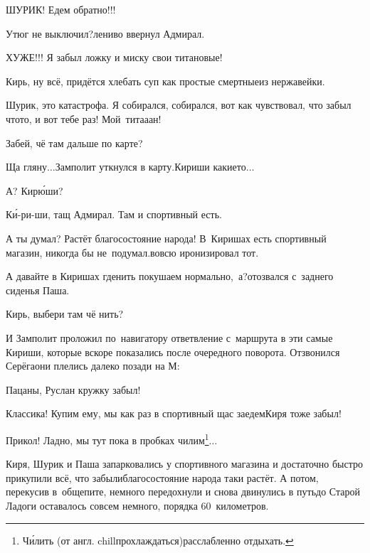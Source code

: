 \diagdash ШУРИК! Едем обратно!!!

\diagdash Утюг не выключил?\mdash лениво ввернул Адмирал.

\diagdash ХУЖЕ!!! Я забыл ложку и миску свои титановые!

\diagdash Кирь, ну всё, придётся хлебать суп как простые смертные\mdash из нержавейки.

\diagdash Шурик, это катастрофа. Я собирался, собирался, вот как чувствовал, что забыл что\sdash то, и вот тебе раз! Мой~тита\sdash а\sdash ан!

\diagdash Забей, чё там дальше по карте?

\diagdash Ща гляну$\ldots$\mdash Замполит уткнулся в карту.\mdash Кириши какие\sdash то$\ldots$

\diagdash А? Кир\'юши?

\diagdash К\'и-ри-ши, тащ Адмирал. Там и спортивный есть.

\diagdash А ты думал? Растёт благосостояние народа! В~Киришах есть спортивный магазин, никогда бы не~подумал.\mdash вовсю иронизировал тот.

\diagdash А давайте в Киришах где\sdash нить покушаем нормально,~а?\mdash отозвался с~заднего сиденья Паша.


\diagdash Кирь, выбери там чё нить?

И Замполит проложил по~навигатору ответвление с~маршрута в эти самые Кириши, которые вскоре показались после очередного поворота. Отзвонился Серёга\mdash они плелись далеко позади на М:

\diagdash Пацаны, Руслан кружку забыл!

\diagdash Классика! Купим ему, мы как раз в спортивный щас заедем\mdash Киря тоже забыл!

\renewcommand*{\thefootnote}{\fnsymbol{footnote}}
\setcounter{footnote}{0}
\diagdash Прикол! Ладно, мы тут пока в пробках чилим\footnote{Ч\'{и}лить (от англ. chill\mdash прохлаждаться)\mdash расслабленно отдыхать.}$\ldots$

Киря, Шурик и Паша запарковались у спортивного магазина и достаточно быстро прикупили всё, что забыли\mdash благосостояние народа таки растёт. А потом, перекусив в~общепите, немного передохнули и снова двинулись в путь\mdash до Старой Ладоги оставалось совсем немного, порядка 60~километров.

